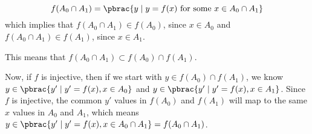 {{    \item
    \begin{equation*}
      f(A_0 \cap A_1) = \pbrac{y \mid y = f(x) \text{ for some } x \in A_0 \cap A_1}
    \end{equation*}
    which implies that $f(A_0 \cap A_1) \in f(A_0)$, since $x \in A_0$ and $f(A_0 \cap A_1) \in f(A_1)$, since $x \in A_1$.

    This means that $f(A_0 \cap A_1) \subset f(A_0) \cap f(A_1)$.

    Now, if $f$ is injective, then if we start with $y \in f(A_0) \cap f(A_1)$,
    we know $y \in \pbrac{y' \mid y' = f(x), x \in A_0}$ and
    $y \in \pbrac{y' \mid y' = f(x), x \in A_1}$. Since $f$ is injective, the
    common $y'$ values in $f(A_0)$ and $f(A_1)$ will map to the same $x$ values
    in $A_0$ and $A_1$, which means $y \in \pbrac{y' \mid y' = f(x), x \in A_0 \cap A_1} = f(A_0 \cap A_1)$.
  }
}


